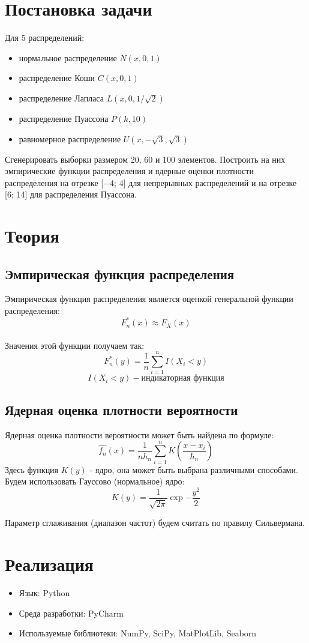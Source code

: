 \section{Постановка задачи}
Для 5 распределений:
\begin{itemize}
\item нормальное распределение \( N(x, 0, 1) \)
\item распределение Коши \( C(x, 0, 1) \)
\item распределение Лапласа \( L(x, 0, 1/\sqrt{2}) \)
\item распределение Пуассона \( P(k, 10) \)
\item равномерное распределение \( U(x, -\sqrt{3}, \sqrt{3}) \)
\end{itemize}
Сгенерировать выборки размером 20, 60 и 100 элементов.
Построить на них эмпирические функции распределения и ядерные оценки плотности распределения на отрезке [−4; 4] для непрерывных распределений и на отрезке [6; 14] для распределения Пуассона.


\section{Теория}
\subsection{Эмпирическая функция распределения}
Эмпирическая функция распределения является оценкой генеральной функции распределения:
\[F_{n}^{*}(x) \approx F_{X}(x)\]
\\
Значения этой функции получаем так:
\[F_{n}^{*}(y) = \frac{1}{n} \sum_{i=1}^n I(X_i < y)\]
\[I(X_i < y) - \text{индикаторная функция}\]

\subsection{Ядерная оценка плотности вероятности}
Ядерная оценка плотности вероятности может быть найдена по формуле:
\[\hat{f_n}(x) = \frac{1}{nh_n} \sum_{i=1}^n K(\frac{x - x_i}{h_n})\]
Здесь функция \(K(y)\) - ядро, она может быть выбрана различными способами. Будем использовать Гауссово (нормальное) ядро:
\[K(y) = \frac{1}{\sqrt{2\pi}} \exp{-\frac{y^2}{2}}\]

Параметр сглаживания (диапазон частот) будем считать по правилу Сильвермана.


\section{Реализация}
\begin{itemize}
\item Язык: Python
\item Среда разработки: PyCharm
\item Используемые библиотеки: NumPy, SciPy, MatPlotLib, Seaborn
\end{itemize}


